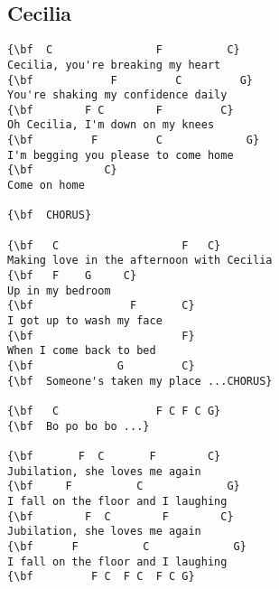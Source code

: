 \documentclass[a4paper]{article}
\begin{document}
\subsection{Cecilia}
\begin{multicols}{2}\begin{Verbatim}[commandchars=\\\{\}]
{\bf  C                F          C}
Cecilia, you're breaking my heart
{\bf            F         C         G}
You're shaking my confidence daily
{\bf        F C        F         C}
Oh Cecilia, I'm down on my knees
{\bf         F         C             G}
I'm begging you please to come home
{\bf           C}
Come on home

{\bf  CHORUS}

{\bf   C                   F   C}
Making love in the afternoon with Cecilia
{\bf   F    G     C}
Up in my bedroom
{\bf               F       C}
I got up to wash my face
{\bf                       F}
When I come back to bed
{\bf             G         C}
{\bf  Someone's taken my place ...CHORUS}

{\bf   C               F C F C G}
{\bf  Bo po bo bo ...}

{\bf       F  C       F        C}
Jubilation, she loves me again
{\bf     F          C             G}
I fall on the floor and I laughing
{\bf        F  C        F        C}
Jubilation, she loves me again
{\bf      F          C             G}
I fall on the floor and I laughing
{\bf         F C  F C  F C G}

\end{Verbatim}
\end{multicols}\newpage
\end{document}
